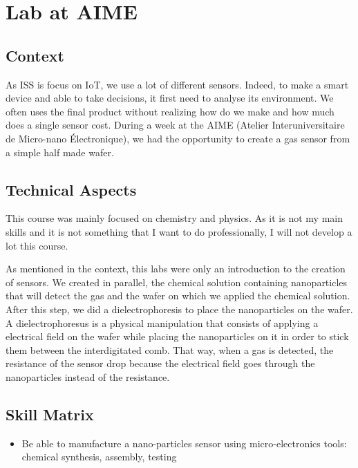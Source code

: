 \section{Lab at AIME}

\subsection{Context}

As ISS is focus on IoT, we use a lot of different sensors. Indeed, to make a smart device and able to take decisions, it first need to analyse its environment. We often uses the final product without realizing how do we make and how much does a single sensor cost. During a week at the AIME (Atelier Interuniversitaire de Micro-nano Électronique), we had the opportunity to create a gas sensor from a simple half made wafer.

\subsection{Technical Aspects}

This course was mainly focused on chemistry and physics. As it is not my main skills and it is not something that I want to do professionally, I will not develop a lot this course. 
\\\par

As mentioned in the context, this labs were only an introduction to the creation of sensors. We created in parallel, the chemical solution containing nanoparticles that will detect the gas and the wafer on which we applied the chemical solution. After this step, we did a dielectrophoresis to place the nanoparticles on the wafer. A dielectrophoresus is a physical manipulation that consists of applying a electrical field on the wafer while placing the nanoparticles on it in order to stick them between the interdigitated comb. That way, when a gas is detected, the resistance of the sensor drop because the electrical field goes through the nanoparticles instead of the resistance. 

\subsection{Skill Matrix}

\begin{itemize}
    \item Be able to manufacture a nano-particles sensor using micro-electronics tools: chemical synthesis, assembly, testing 
\end{itemize}

